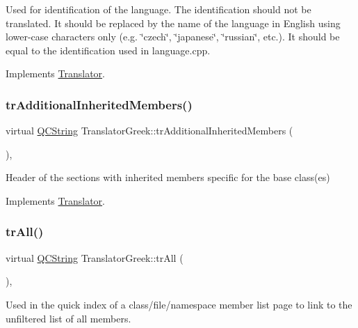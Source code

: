 Used for identification of the language. The identification should not be translated. It should be replaced by the name of the language in English using lower-\/case characters only (e.\+g. \char`\"{}czech\char`\"{}, \char`\"{}japanese\char`\"{}, \char`\"{}russian\char`\"{}, etc.). It should be equal to the identification used in language.\+cpp. 

Implements \mbox{\hyperlink{class_translator}{Translator}}.

\mbox{\label{class_translator_greek_a64fd58b24240fc6ffe848cd892d5048d}} 
\subsubsection{\texorpdfstring{trAdditionalInheritedMembers()}{trAdditionalInheritedMembers()}}
{\footnotesize\ttfamily virtual \mbox{\hyperlink{class_q_c_string}{Q\+C\+String}} Translator\+Greek\+::tr\+Additional\+Inherited\+Members (\begin{DoxyParamCaption}{ }\end{DoxyParamCaption})\hspace{0.3cm}{\ttfamily [inline]}, {\ttfamily [virtual]}}

Header of the sections with inherited members specific for the base class(es) 

Implements \mbox{\hyperlink{class_translator}{Translator}}.

\mbox{\label{class_translator_greek_a5082c13f8ead248e0a2890d82b4ce2c9}} 
\subsubsection{\texorpdfstring{trAll()}{trAll()}}
{\footnotesize\ttfamily virtual \mbox{\hyperlink{class_q_c_string}{Q\+C\+String}} Translator\+Greek\+::tr\+All (\begin{DoxyParamCaption}{ }\end{DoxyParamCaption})\hspace{0.3cm}{\ttfamily [inline]}, {\ttfamily [virtual]}}

Used in the quick index of a class/file/namespace member list page to link to the unfiltered list of all members. 

